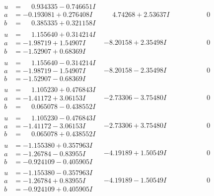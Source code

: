 \documentclass[1p]{elsarticle_modified}
\theoremstyle{definition}
\begin{document}
$$\begin{array}{c|c|c}
\begin{aligned}
u &= \phantom{-}0.934335 - 0.746651 I \\
a &= -0.193081 + 0.276408 I \\
b &= \phantom{-}0.385335 + 0.321158 I\end{aligned}
 & \phantom{-}4.74268 + 2.53637 I & \phantom{-0.000000 } 0 \\ \hline\begin{aligned}
u &= \phantom{-}1.155640 + 0.314214 I \\
a &= -1.98719 + 1.54907 I \\
b &= -1.52907 + 0.68369 I\end{aligned}
 & -8.20158 + 2.35498 I & \phantom{-0.000000 } 0 \\ \hline\begin{aligned}
u &= \phantom{-}1.155640 - 0.314214 I \\
a &= -1.98719 - 1.54907 I \\
b &= -1.52907 - 0.68369 I\end{aligned}
 & -8.20158 - 2.35498 I & \phantom{-0.000000 } 0 \\ \hline\begin{aligned}
u &= \phantom{-}1.105230 + 0.476843 I \\
a &= -1.41172 + 3.06153 I \\
b &= \phantom{-}0.065078 - 0.438552 I\end{aligned}
 & -2.73306 - 3.75480 I & \phantom{-0.000000 } 0 \\ \hline\begin{aligned}
u &= \phantom{-}1.105230 - 0.476843 I \\
a &= -1.41172 - 3.06153 I \\
b &= \phantom{-}0.065078 + 0.438552 I\end{aligned}
 & -2.73306 + 3.75480 I & \phantom{-0.000000 } 0 \\ \hline\begin{aligned}
u &= -1.155380 + 0.357963 I \\
a &= -1.26784 - 0.83955 I \\
b &= -0.924109 - 0.405905 I\end{aligned}
 & -4.19189 + 1.50549 I & \phantom{-0.000000 } 0 \\ \hline\begin{aligned}
u &= -1.155380 - 0.357963 I \\
a &= -1.26784 + 0.83955 I \\
b &= -0.924109 + 0.405905 I\end{aligned}
 & -4.19189 - 1.50549 I & \phantom{-0.000000 } 0 \\ \hline\begin{aligned}

\end{aligned}
\end{array}$$
\end{document}
